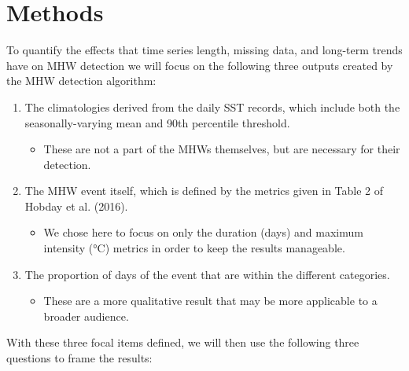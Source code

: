 \documentclass[]{article}
\providecommand{\tightlist}{%
  \setlength{\itemsep}{0pt}\setlength{\parskip}{0pt}}
\begin{document}
\section{Methods}\label{methods}

To quantify the effects that time series length, missing data, and
long-term trends have on MHW detection we will focus on the following
three outputs created by the MHW detection algorithm:

\begin{enumerate}
\def\labelenumi{\arabic{enumi})}
\tightlist
\item
  The climatologies derived from the daily SST records, which include
  both the seasonally-varying mean and 90th percentile threshold.

  \begin{itemize}
  \tightlist
  \item
    These are not a part of the MHWs themselves, but are necessary for
    their detection.
  \end{itemize}
\item
  The MHW event itself, which is defined by the metrics given in Table 2
  of Hobday et al. (2016).

  \begin{itemize}
  \tightlist
  \item
    We chose here to focus on only the duration (days) and maximum
    intensity (°C) metrics in order to keep the results manageable.
  \end{itemize}
\item
  The proportion of days of the event that are within the different
  categories.

  \begin{itemize}
  \tightlist
  \item
    These are a more qualitative result that may be more applicable to a
    broader audience.
  \end{itemize}
\end{enumerate}

With these three focal items defined, we will then use the following
three questions to frame the results:
\end{document}
